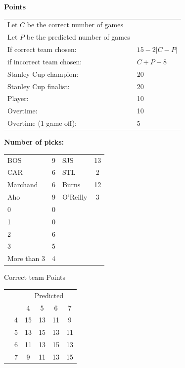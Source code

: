 \documentclass[10pt]{article}
\newcommand{\mccn}[2]{\multicolumn{#1}{c}{#2}}
\begin{document}
{\bf Points}\\
\begin{minipage}[t]{10cm}
    \vspace{0pt}
    \begin{tabular}{l l}
        Let $C$ be the correct number of games\\
        Let $P$ be the predicted number of games\\
        If correct team chosen:	   & $15 - 2 \left|{C - P}\right|$\\
        if incorrect team chosen:  & $C + P - 8$\\
        Stanley Cup champion:	& 20\\
        Stanley Cup finalist:	& 20\\
        Player:                 & 10\\
        Overtime:               & 10\\
        Overtime (1 game off):  & 5\\
    \end{tabular}

    \vspace{0.5cm}
    {\bf Number of picks:}\\
    \begin{tabular}{lc | lc }
        BOS & 9 & SJS & 13 \\
        CAR & 6 & STL & 2 \\
        Marchand & 6 & Burns & 12 \\
        Aho & 9 & O'Reilly & 3 \\
        \rule{0pt}{3.5ex}0 & 0\\
        1 & 0\\
        2 & 6\\
        3 & 5\\
        More than 3 & 4
    \end{tabular}
\end{minipage}
%
\begin{minipage}[t]{4cm}
    \vspace{0pt}
    \qquad Correct team Points\\
    \begin{tabular}{c l | c c c c }
        \mccn{2}{} & \mccn{4}{Predicted}\\
        & & 4 & 5 & 6 & 7\\\cline{2-6}
        \parbox[t]{2mm}{} & 4 & 15 & 13 & 11 & 9\\
        & 5 & 13 & 15 & 13 & 11\\
        & 6 & 11 & 13 & 15 & 13\\
        & 7 & 9 & 11 & 13 & 15
    \end{tabular}
\end{minipage}
\end{document}
